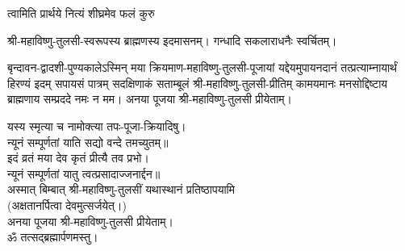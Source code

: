 {त्वामिति प्रार्थये नित्यं शीघ्रमेव फलं कुरु}

श्री-महाविष्णु-तुलसी-स्वरूपस्य ब्राह्मणस्य इदमासनम्। गन्धादि सकलाराधनैः स्वर्चितम्।

\hiranyagarbha

बृन्दावन-द्वादशी-पुण्यकालेऽस्मिन् मया क्रियमाण-महाविष्णु-तुलसी-पूजायां यद्देयमुपायनदानं तत्प्रत्याम्नायार्थं
हिरण्यं इदम् सपायसं पात्रम् सदक्षिणाकं सताम्बूलं श्री-महाविष्णु-तुलसी-प्रीतिम्
कामयमानः मनसोद्दिष्टाय ब्राह्मणाय सम्प्रददे नमः न मम।
अनया पूजया श्री-महाविष्णु-तुलसी प्रीयेताम्।

यस्य स्मृत्या च नामोक्त्या तपः-पूजा-क्रियादिषु।\\
न्यूनं सम्पूर्णतां याति सद्यो वन्दे तमच्युतम्॥ \\
इदं व्रतं मया देव कृतं प्रीत्यै तव प्रभो।\\
न्यूनं सम्पूर्णतां यातु त्वत्प्रसादाज्जनार्द्दन॥\\

अस्मात् बिम्बात् श्री-महाविष्णु-तुलसीं यथास्थानं प्रतिष्ठापयामि\\
(अक्षतानर्पित्वा देवमुत्सर्जयेत्।)\\
अनया पूजया श्री-महाविष्णु-तुलसी प्रीयेताम्। \\
ॐ तत्सद्ब्रह्मार्पणमस्तु।